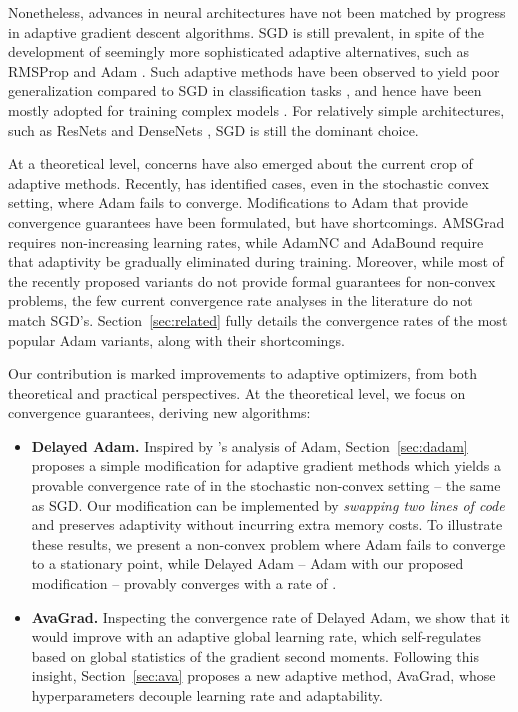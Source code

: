 \documentclass{article}
\begin{document}
Nonetheless, advances in neural architectures have not been matched by progress
in adaptive gradient descent algorithms.  SGD is still prevalent, in
spite of the development of seemingly more sophisticated adaptive alternatives,
such as RMSProp \citep{rmsprop} and Adam \citep{adam}.  Such adaptive methods
have been observed to yield poor generalization compared to SGD in
classification tasks \citep{marginal}, and hence have been mostly adopted for
training complex models \citep{transformers, wgan}.  For relatively simple
architectures, such as ResNets \citep{resnet1} and DenseNets \citep{densenet},
SGD is still the dominant choice.

At a theoretical level, concerns have also emerged about the current crop of
adaptive methods.  Recently, \citet{amsgrad} has identified cases, even in the
stochastic convex setting, where Adam \citep{adam} fails to converge.
Modifications to Adam that provide convergence guarantees have been formulated,
but have shortcomings.  AMSGrad \citep{amsgrad} requires non-increasing
learning rates, while AdamNC \citep{amsgrad} and AdaBound \citep{adabound}
require that adaptivity be gradually eliminated during training.  Moreover,
while most of the recently proposed variants do not provide formal guarantees
for non-convex problems, the few current convergence rate analyses in the literature \citep{yogi,adamlike} do not match SGD's.  Section~\ref{sec:related} fully
details the convergence rates of the most popular Adam variants, along with
their shortcomings.

Our contribution is marked improvements to adaptive optimizers, from both
theoretical and practical perspectives.  At the theoretical level, we focus on
convergence guarantees, deriving new algorithms:

\vspace{-5.0pt}
\begin{itemize}[leftmargin=0.2in]
   \item{
      \textbf{Delayed Adam.} Inspired by \citet{yogi}'s analysis of Adam,
      Section~\ref{sec:dadam} proposes a simple modification for adaptive
      gradient methods which yields a provable convergence rate of
       in the stochastic non-convex setting -- the same as SGD.
      Our modification can be implemented by \emph{swapping two lines of code}
      and preserves adaptivity without incurring extra memory costs.  To
      illustrate these results, we present a non-convex problem where Adam
      fails to converge to a stationary point, while Delayed Adam -- Adam with
      our proposed modification -- provably converges with a rate of
      .
   }
   \item{
      \textbf{AvaGrad.}
      Inspecting the convergence rate of Delayed Adam, we show that it would
      improve with an adaptive global learning rate, which self-regulates based
      on global statistics of the gradient second moments.  Following this
      insight, Section~\ref{sec:ava} proposes a new adaptive method, AvaGrad,
      whose hyperparameters decouple learning rate and adaptability.
   }
\end{itemize}
\end{document}
